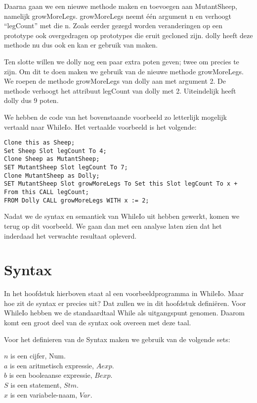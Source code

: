 \documentclass[12pt]{article}
\begin{document}
Daarna gaan we een nieuwe methode maken en toevoegen aan MutantSheep, namelijk growMoreLegs.
growMoreLegs neemt \'e\'en argument n en verhoogt ``legCount'' met die n. 
Zoals eerder gezegd worden veranderingen op een prototype ook overgedragen op prototypes die eruit gecloned zijn. dolly heeft deze methode nu dus ook en kan er gebruik van maken.\newline

Ten slotte willen we dolly nog een paar extra poten geven; twee om precies te zijn.
Om dit te doen maken we gebruik van de nieuwe methode growMoreLegs.
We roepen de methode growMoreLegs van dolly aan met argument 2.
De methode verhoogt het attribuut legCount van dolly met 2.
Uiteindelijk heeft dolly dus 9 poten.

We hebben de code van het bovenstaande voorbeeld zo letterlijk mogelijk vertaald naar WhileIo.
Het vertaalde voorbeeld is het volgende:
\begin{lstlisting}[frame=single]
Clone this as Sheep;
Set Sheep Slot legCount To 4;
Clone Sheep as MutantSheep;
SET MutantSheep Slot legCount To 7;
Clone MutantSheep as Dolly;
SET MutantSheep Slot growMoreLegs To Set this Slot legCount To x + From this CALL legCount;
FROM Dolly CALL growMoreLegs WITH x := 2;
\end{lstlisting}
Nadat we de syntax en semantiek van WhileIo uit hebben gewerkt, komen we terug op dit voorbeeld.
We gaan dan met een analyse laten zien dat het inderdaad het verwachte resultaat opleverd.

\pagebreak
\section{Syntax}
In het hoofdstuk hierboven staat al een voorbeeldprogramma in WhileIo. Maar hoe zit de syntax er precies uit? Dat zullen we in dit hoofdstuk definiëren. Voor WhileIo hebben we de standaardtaal While als uitgangspunt genomen. Daarom komt een groot deel van de syntax ook overeen met deze taal.

Voor het definieren van de Syntax maken we gebruik van de volgende sets:

$n$ is een cijfer, Num. \\
$a$ is een aritmetisch expressie, $Aexp$. \\
$b$ is een booleaanse expressie, $Bexp$. \\
$S$ is een statement, $Stm$. \\
$x$ is een variabele-naam, $Var$. \\
\end{document}
